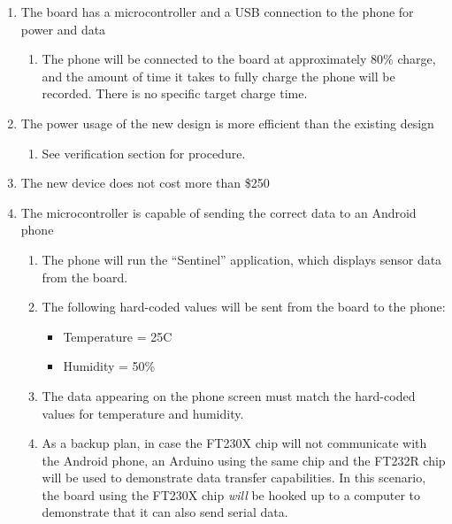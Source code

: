 \documentclass{article}
\numberwithin{figure}{section}
\numberwithin{equation}{section}
\begin{document}
{\begin{enumerate}[align=left,leftmargin=*, labelindent= 0em, label=\textbf{\CheckBox{} Item \thesubsubsection.\arabic*.}, itemindent=0em]
    \item \label{val1}The board has a microcontroller and a USB connection to the phone for power and data
        \begin{enumerate}[label=\CheckBox{}]
            \item The phone will be connected to the board at approximately 80\% charge, and the amount of time it takes to fully charge the phone will be recorded. There is no specific target charge time.
        \end{enumerate}
    \item \label{val2}The power usage of the new design is more efficient than the existing design
        \begin{enumerate}[label=\CheckBox{}]
            \item See verification section for procedure.
        \end{enumerate}
    \item \label{val3}The new device does not cost more than \$250
    \item \label{val4}The microcontroller is capable of sending the correct data to an Android phone
        \begin{enumerate}[label=\CheckBox{}]
            \item The phone will run the ``Sentinel'' application, which displays sensor data from the board.
            \item The following hard-coded values will be sent from the board to the phone:
                \begin{itemize}
                    \item Temperature = 25C
                    \item Humidity = 50\%
                \end{itemize}
            \item The data appearing on the phone screen must match the hard-coded values for temperature and humidity.
            \item As a backup plan, in case the FT230X chip will not communicate with the Android phone, an Arduino using the same chip and the FT232R chip will be used to demonstrate data transfer capabilities. In this scenario, the board using the FT230X chip \emph{will} be hooked up to a computer to demonstrate that it can also send serial data.
        \end{enumerate}

\end{enumerate}}
\end{document}
